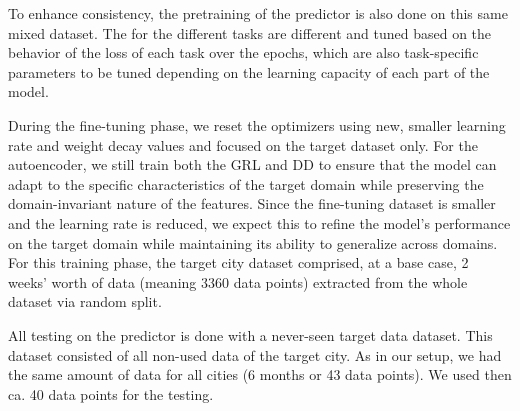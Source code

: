 To enhance consistency, the pretraining of the predictor is also done on this same mixed dataset. The  for the different tasks are different and tuned based on the behavior of the loss of each task over the epochs, which are also task-specific parameters to be tuned depending on the learning capacity of each part of the model.

During the fine-tuning phase, we reset the optimizers using new, smaller learning rate and weight decay values and focused on the target dataset only. For the autoencoder, we still train both the \gls{GRL} and \gls{DD} to ensure that the model can adapt to the specific characteristics of the target domain while preserving the domain-invariant nature of the features. Since the fine-tuning dataset is smaller and the learning rate is reduced, we expect this to refine the model's performance on the target domain while maintaining its ability to generalize across domains. For this training phase, the target city dataset comprised, at a base case, 2 weeks' worth of data (meaning 3360 data points) extracted from the whole dataset via random split.

All testing on the predictor is done with a never-seen target data dataset. This dataset consisted of all non-used data of the target city. As in our setup, we had the same amount of data for all cities (6 months or 43 data points). We used then ca. 40 data points for the testing.

